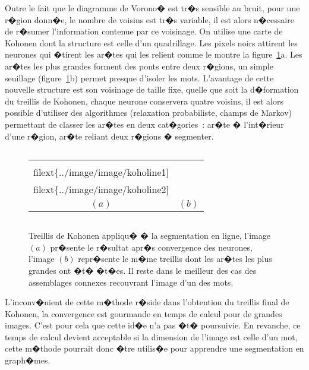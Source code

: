 Outre le fait que le diagramme de Vorono� est tr�s sensible au bruit, pour une r�gion donn�e, le nombre de voisins est tr�s variable, il est alors n�cessaire de r�sumer l'information contenue par ce voisinage. On utilise une carte de Kohonen dont la structure est celle d'un quadrillage. Les pixels noirs attirent les neurones qui �tirent les ar�tes qui les relient comme le montre la figure~\ref{image_koho_lines}a. Les ar�tes les plus grandes forment des ponts entre deux r�gions, un simple seuillage (figure~\ref{image_koho_lines}b) permet presque d'isoler les mots. L'avantage de cette nouvelle structure est son voisinage de taille fixe, quelle que soit la d�formation du treillis de Kohonen, chaque neurone conservera quatre voisins, il est alors possible d'utiliser des algorithmes (relaxation probabiliste, champs de Markov) permettant de classer les ar�tes en deux cat�gories~: ar�te � l'int�rieur d'une r�gion, ar�te reliant deux r�gions � segmenter.



            \begin{figure}[ht]
        $$\begin{tabular}{|c|c|}\hline
        \texttt{[image: \\filext\{../image/image/koholine1]}} &
        \texttt{[image: \\filext\{../image/image/koholine2]}} \\
        $(a)$ & $(b)$ 
        \\ \hline \end{tabular}$$
        \caption{    Treillis de Kohonen appliqu� � la segmentation en ligne, l'image $(a)$ 
                            pr�sente le r�sultat apr�s convergence
                            des neurones, l'image $(b)$ repr�sente le m�me treillis dont les ar�tes les 
                            plus grandes ont �t� �t�es. Il reste dans le meilleur des cas des assemblages connexes
                            recouvrant l'image d'un des mots.}
        \label{image_koho_lines}
            \end{figure}


L'inconv�nient de cette m�thode r�side dans l'obtention du treillis final de Kohonen, la convergence est gourmande en temps de calcul pour de grandes images. C'est pour cela que cette id�e n'a pas �t� poursuivie. En revanche, ce temps de calcul devient acceptable si la dimension de l'image est celle d'un mot, cette m�thode pourrait donc �tre utilis�e pour apprendre une segmentation en graph�mes. 

